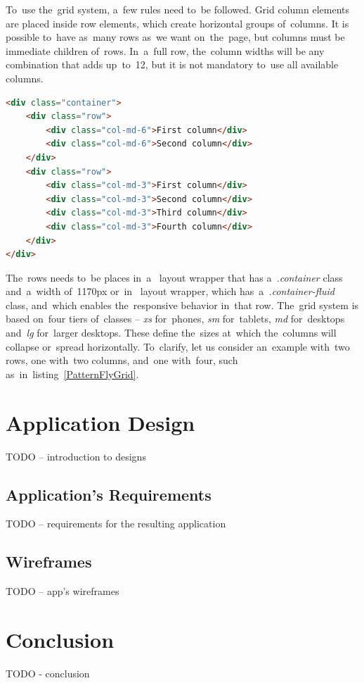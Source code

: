 To~use the~grid system, a~few rules need to~be followed. Grid column elements
are placed inside row elements, which create horizontal groups of~columns. It is
possible to~have as~many rows as~we want on~the~page, but columns must be
immediate children of~rows. In~a~full row, the~column widths will be any
combination that adds up~to~12, but it is not mandatory to~use all available
columns.

\vspace{2mm}
\begin{lstlisting}[caption=An~example of~the~grid system
in~PatternFly.,label=PatternFlyGrid,language=HTML]
<div class="container">
	<div class="row">
		<div class="col-md-6">First column</div>
		<div class="col-md-6">Second column</div>
	</div>
	<div class="row">
		<div class="col-md-3">First column</div>
		<div class="col-md-3">Second column</div>
		<div class="col-md-3">Third column</div>
		<div class="col-md-3">Fourth column</div>
	</div>
</div>
\end{lstlisting}
  
The~rows needs to~be places in~a~ layout wrapper that has
a~\textit{.container} class and~a~width of~1170px or~in~ layout
wrapper, which has~a~\textit{.container-fluid} class, and~which enables
the~responsive behavior in~that row. The~grid system is based on~four tiers
of~classes -- \textit{xs} for~phones, \textit{sm} for~tablets, \textit{md}
for~desktops and~\textit{lg} for~larger desktops. These define the~sizes
at~which the~columns will collapse or~spread horizontally. To~clarify, let us
consider an~example with~two rows, one with~two columns, and~one with~four, such
as~in~listing~\ref{PatternFlyGrid}.




\chapter{Application Design}
\label{Design}
TODO -- introduction to designs

\section{Application's Requirements}
TODO -- requirements for the resulting application

\section{Wireframes}
TODO -- app's wireframes




\chapter{Conclusion}
TODO - conclusion


